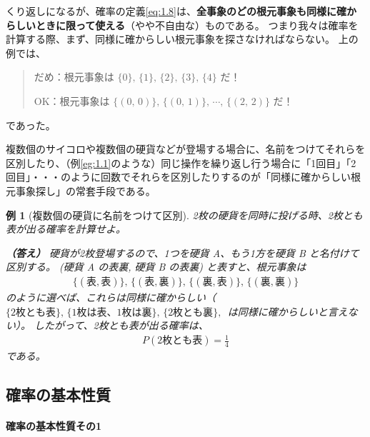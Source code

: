 \documentclass[12pt]{ltjsarticle}\usepackage{ifthen}\newcounter{enlarge}\setcounter{enlarge}{1}
\newtheorem{eg}{例}
\begin{document}
くり返しになるが、確率の定義\eqref{eq:1.8}は、\textbf{全事象のどの根元事象も同様に確からしいときに限って使える}（やや不自由な）ものである。
つまり我々は確率を計算する際、まず、同様に確からしい根元事象を探さなければならない。
上の例では、
\begin{quotation}
  だめ：根元事象は $\{0\},\,\{1\},\,\{2\},\,\{3\},\,\{4\}$ だ！
  
  OK：根元事象は $\{(0,\, 0)\},\, \{(0,\, 1)\},\, \cdots ,\, \{(2,\,2)\}$ だ！
\end{quotation}
であった。

複数個のサイコロや複数個の硬貨などが登場する場合に、名前をつけてそれらを区別したり、（例\ref{eg:1.1}のような）同じ操作を繰り返し行う場合に「1回目」「2回目」・・・のように回数でそれらを区別したりするのが「同様に確からしい根元事象探し」の常套手段である。

\begin{eg}[複数個の硬貨に名前をつけて区別]
  2枚の硬貨を同時に投げる時、2枚とも表が出る確率を計算せよ。

  \textbf{（答え）}
  硬貨が2枚登場するので、1つを硬貨 A、もう1方を硬貨 B と名付けて区別する。
  (硬貨 A の表裏, 硬貨 B の表裏) と表すと、根元事象は
  \begin{align}
    \{(\text{表}, \text{表})\},\, \{(\text{表}, \text{裏})\},\, \{(\text{裏}, \text{表})\},\, \{(\text{裏}, \text{裏})\} \label{eq:1.11}
  \end{align}
  のように選べば、これらは同様に確からしい（$\{\text{2枚とも表}\},\, \{\text{1枚は表、1枚は裏}\},\, \{\text{2枚とも裏}\},\,$ は同様に確からしいと言えない）。
  したがって、2枚とも表が出る確率は、
  \begin{align}
    P(\text{2枚とも表}) = \frac{1}{4} \label{eq:1.12}
  \end{align}
  である。
\end{eg}

\subsection{確率の基本性質}

\paragraph{確率の基本性質その1}
\end{document}
